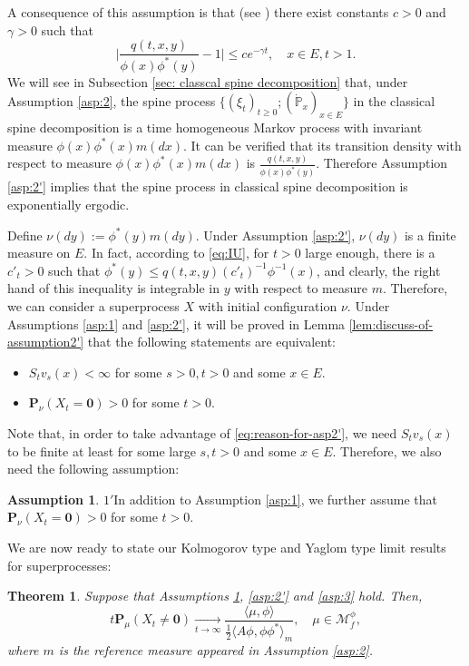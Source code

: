 \documentclass[UTF8]{pkuthss}
\theoremstyle{plain}
\newtheorem{thm}{Theorem}[section]
\theoremstyle{definition}
\newtheorem{asp}{Assumption}[chapter]
\numberwithin{equation}{section}
\begin{document}
		A consequence of this assumption is that (see \cite[Theorem 2.7]{KimSong2008Intrinsic})
there exist constants $c>0$ and $\gamma >0$ such that
\begin{equation}\label{eq:IU}
	\Big|\frac{q(t,x,y)}{\phi(x)\phi^*(y)} - 1\Big| \leq c e^{-\gamma t}, \quad x\in E, t> 1.
\end{equation}
	We will see in Subsection \ref{sec: classcal spine decomposition} that, under Assumption \ref{asp:2}, the spine process $\{(\xi_t)_{t\geq 0}; (\dot{\mathbb P}_x)_{x\in E}\}$ in the classical spine decomposition is a time homogeneous Markov process with invariant measure $\phi(x)\phi^*(x)m(dx)$.
	It can be verified that its transition density with respect to measure $\phi(x)\phi^*(x)m(dx)$ is
$
\frac{q(t,x,y)}{\phi(x)\phi^*(y)}.
$
Therefore Assumption \ref{asp:2'} implies that the spine process in classical spine decomposition is exponentially ergodic.

	Define $\nu(dy) := \phi^*(y)m(dy)$.
	Under Assumption \ref{asp:2'},  $\nu(dy)$ is a finite measure on $E$.
	In fact, according to \eqref{eq:IU}, for $t>0$ large enough, there is a $c'_t>0$ such that $\phi^*(y) \leq q(t,x,y)  (c'_t)^{-1}\phi^{-1}(x)$,
	and clearly, the right hand of this inequality is integrable in $y$ with respect to measure $m$.
    Therefore, we can consider a superprocess $X$ with initial configuration $\nu$.
    Under Assumptions \ref{asp:1} and \ref{asp:2'}, it will be proved in Lemma \ref{lem:discuss-of-assumption2'} that the following statements are equivalent:
\begin{itemize}
\item
	$S_tv_s(x)<\infty$ for some $s>0,t>0$ and some $x\in E$.
\item
	$\mathbf P_\nu (X_t = \mathbf 0) > 0$ for some $t>0$.
\end{itemize}
	Note that, in order to take advantage of \eqref{eq:reason-for-asp2'}, we need $S_t v_s(x)$ to be finite at least for some large $s,t>0$ and  some $x\in E$.
	Therefore, we also need the following assumption:
	
	\begin{asp}{$1'$}\label{asp:1'}
	In addition to Assumption \ref{asp:1}, we further assume that $\mathbf P_\nu (X_t = \mathbf 0) > 0$ for some $t>0$.
\end{asp}
	
	We are now ready to state our Kolmogorov type and Yaglom type limit results for superprocesses:
\begin{thm}\label{thm:Kolmogorov-type-of-theorem}
	Suppose that Assumptions  \ref{asp:1'}, \ref{asp:2'} and \ref{asp:3} hold. Then,
\[
	t\mathbf P_\mu(X_t\neq \mathbf 0)
	\xrightarrow[t\to\infty]{} \frac{\langle \mu,\phi\rangle} {\frac{1}{2}\langle  A \phi,\phi \phi^*\rangle_m},
	\quad \mu\in \mathcal M^\phi_f,
\]
where $m$ is the reference measure appeared in Assumption \ref{asp:2}.
\end{thm}
\end{document}

